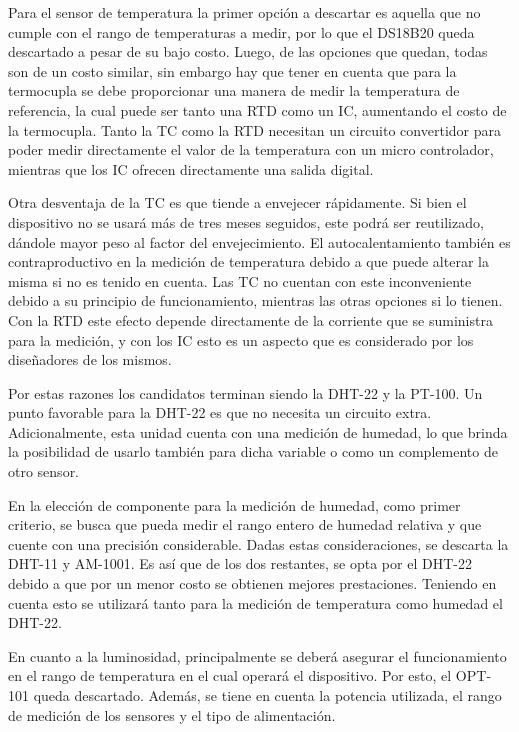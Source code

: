 
Para el sensor de temperatura la primer opción a descartar es aquella que no cumple con el rango de temperaturas a medir, por lo que el DS18B20 queda descartado a pesar de su bajo costo. Luego, de las opciones que quedan, todas son de un costo similar, sin embargo hay que tener en cuenta que para la termocupla se debe proporcionar una manera de medir la temperatura de referencia, la cual puede ser tanto una RTD como un IC, aumentando el costo de la termocupla. Tanto la TC como la RTD necesitan un circuito convertidor para poder medir directamente el valor de la temperatura con un micro controlador, mientras que los IC ofrecen directamente una salida digital.%

Otra desventaja de la TC es que tiende a envejecer rápidamente. Si bien el dispositivo no se usará más de tres meses seguidos, este podrá ser reutilizado, dándole mayor peso al factor del envejecimiento. El autocalentamiento también es contraproductivo en la medición de temperatura debido a que puede alterar la misma si no es tenido en cuenta. Las TC no cuentan con este inconveniente debido a su principio de funcionamiento, mientras las otras opciones si lo tienen. Con la RTD este efecto depende directamente de la corriente que se suministra para la medición, y con los IC esto es un aspecto que es considerado por los diseñadores de los mismos.

Por estas razones los candidatos terminan siendo la DHT-22 y la PT-100. Un punto favorable para la DHT-22 es que no necesita un circuito extra. Adicionalmente, esta unidad cuenta con una medición de humedad, lo que brinda la posibilidad de usarlo también para dicha variable o como un complemento de otro sensor.

En la elección de componente para la medición de humedad, como primer criterio, se busca que pueda medir el rango entero de humedad relativa y que cuente con una precisión considerable. Dadas estas consideraciones, se descarta la DHT-11 y AM-1001. Es así que de los dos restantes, se opta por el DHT-22 debido a que por un menor costo se obtienen mejores prestaciones. Teniendo en cuenta esto se utilizará tanto para la medición de temperatura como humedad el DHT-22.


En cuanto a la luminosidad, principalmente se deberá asegurar el funcionamiento en el rango de temperatura en el cual operará el dispositivo. Por esto, el OPT-101 queda descartado. Además, se tiene en cuenta la potencia utilizada, el rango de medición de los sensores y el tipo de alimentación.


